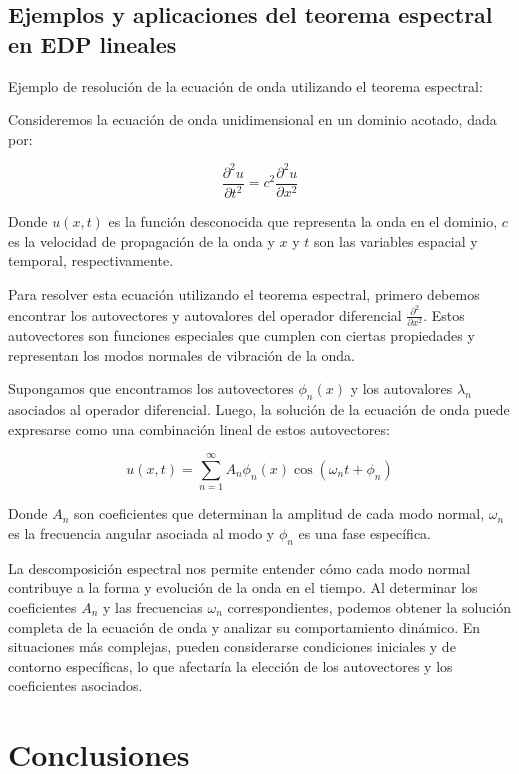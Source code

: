 \documentclass{article}
\begin{document}
    \subsection{Ejemplos y aplicaciones del teorema espectral en EDP lineales}
    Ejemplo de resolución de la ecuación de onda utilizando el teorema espectral:

    Consideremos la ecuación de onda unidimensional en un dominio acotado, dada por:
    
    \[
    \frac{{\partial^2 u}}{{\partial t^2}} = c^2 \frac{{\partial^2 u}}{{\partial x^2}}
    \]
    
    Donde \(u(x, t)\) es la función desconocida que representa la onda en el dominio, \(c\) es la velocidad de propagación de la onda y \(x\) y \(t\) son las variables espacial y temporal, respectivamente.
    
    Para resolver esta ecuación utilizando el teorema espectral, primero debemos encontrar los autovectores y autovalores del operador diferencial \(\frac{{\partial^2}}{{\partial x^2}}\). Estos autovectores son funciones especiales que cumplen con ciertas propiedades y representan los modos normales de vibración de la onda.
    
    Supongamos que encontramos los autovectores \(\phi_n(x)\) y los autovalores \(\lambda_n\) asociados al operador diferencial. Luego, la solución de la ecuación de onda puede expresarse como una combinación lineal de estos autovectores:
    
    \[
    u(x, t) = \sum_{n=1}^{\infty} A_n \phi_n(x) \cos(\omega_n t + \phi_n)
    \]
    
    Donde \(A_n\) son coeficientes que determinan la amplitud de cada modo normal, \(\omega_n\) es la frecuencia angular asociada al modo y \(\phi_n\) es una fase específica.
    
    La descomposición espectral nos permite entender cómo cada modo normal contribuye a la forma y evolución de la onda en el tiempo. Al determinar los coeficientes \(A_n\) y las frecuencias \(\omega_n\) correspondientes, podemos obtener la solución completa de la ecuación de onda y analizar su comportamiento dinámico. En situaciones más complejas, pueden considerarse condiciones iniciales y de contorno específicas, lo que afectaría la elección de los autovectores y los coeficientes asociados.
    
\newpage

\section{Conclusiones}
\newpage
\end{document}
